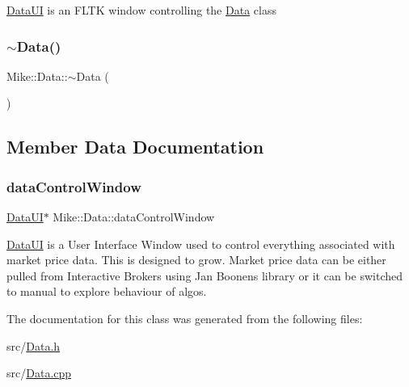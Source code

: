 \hyperlink{class_mike_1_1_data_u_i}{Data\+UI} is an F\+L\+TK window controlling the \hyperlink{class_mike_1_1_data}{Data} class \mbox{\label{class_mike_1_1_data_aca3a0c18d791cca46c27c86caf3059cf}} 
\subsubsection{\texorpdfstring{$\sim$\+Data()}{~Data()}}
{\footnotesize\ttfamily Mike\+::\+Data\+::$\sim$\+Data (\begin{DoxyParamCaption}{ }\end{DoxyParamCaption})}



\subsection{Member Data Documentation}
\mbox{\label{class_mike_1_1_data_a615c7c93b1c7addbe8e888ddbed837a4}} 
\subsubsection{\texorpdfstring{data\+Control\+Window}{dataControlWindow}}
{\footnotesize\ttfamily \hyperlink{class_mike_1_1_data_u_i}{Data\+UI}$\ast$ Mike\+::\+Data\+::data\+Control\+Window\hspace{0.3cm}{\ttfamily [private]}}

\hyperlink{class_mike_1_1_data_u_i}{Data\+UI} is a User Interface Window used to control everything associated with market price data. This is designed to grow. Market price data can be either pulled from Interactive Brokers using Jan Boonen\textquotesingle{}s library or it can be switched to \textquotesingle{}manual\textquotesingle{} to explore behaviour of algos. 

The documentation for this class was generated from the following files\+:\begin{DoxyCompactItemize}
\item 
src/\hyperlink{_data_8h}{Data.\+h}\item 
src/\hyperlink{_data_8cpp}{Data.\+cpp}\end{DoxyCompactItemize}
